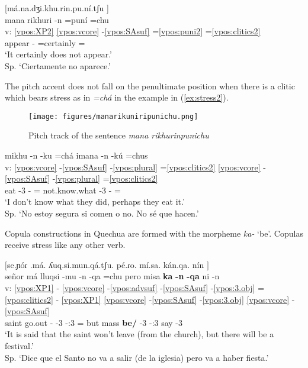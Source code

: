\documentclass[output=paper]{langscibook}
\begin{document}
\ea \label{ex:stress1}{
	[má.na.dʒi.khu.rin.pu.ní.tʃu \downarrow] \\
	\glll {} mana rikhuri -n =puní =chu \\
            v: \ref{vpos:XP2} \ref{vpos:vcore} -\ref{vpos:SAsuf} =\ref{vpos:puni2} =\ref{vpos:clitics2}  \\
            {} \Neg{} appear -\Third{} =certainly =\Neg{} \\
	\glt `It certainly does not appear.' \\  Sp. `Ciertamente no aparece.'
	}
\z

The pitch accent does not fall on the penultimate position when there is a clitic which bears stress as in \textit{=chá} in the example in (\ref{ex:stress2}).


\begin{figure}
    \centering
    \texttt{[image: figures/manarikuniripunichu.png]}
    \caption{Pitch track of the sentence \textit{mana rikhurinpunichu}}
    \label{fig:manarikhurinpunichu}
\end{figure}


\ea \label{ex:stress2}{
	\glll {} mikhu -n -ku =chá imana -n -kú =chus \\
            v: \ref{vpos:vcore} -\ref{vpos:SAsuf} -\ref{vpos:plural} =\ref{vpos:clitics2} \ref{vpos:vcore} -\ref{vpos:SAsuf} -\ref{vpos:plural} =\ref{vpos:clitics2} \\
            {} eat -3 -\Pl{} =\Dub{} not.know.what -3 -\Pl{} =\Dub{}  \\
	\glt `I don't know what they did, perhaps they eat it.' \\ Sp. `No estoy segura si comen o no. No sé que hacen.' 
	}
\z

Copula constructions in Quechua are formed with the morpheme \textit{ka-} `be'. Copulas receive stress like any other verb.

\ea{}
    $[$se.ɲóɾ .má. ʎuq.si.mun.qá.tʃu. pé.ɾo. mí.sa. kán.qa. nín \downarrow$]$ \\
    \glll {} señor má lluqsi -mu -n -qa =chu pero misa \textbf{ka} \textbf{-n} \textbf{-qa} ni -n \\
    v: \ref{vpos:XP1} - \ref{vpos:vcore} -\ref{vpos:advsuf} -\ref{vpos:SAsuf} -\ref{vpos:3.obj} =\ref{vpos:clitics2} - \ref{vpos:XP1} \ref{vpos:vcore} -\ref{vpos:SAsuf} -\ref{vpos:3.obj} \ref{vpos:vcore} -\ref{vpos:SAsuf}     \\
    {} saint \Neg{} go.out -\Dir{} -3 -\Fut{}:3 =\Neg{} but mass \textbf{be/\Aux{}} -3 -\Fut{}:3 say -3  \\
    \glt `It is said that the saint won't leave (from the church), but there will be a festival.' \\ Sp. `Dice que el Santo no va a salir (de la iglesia) pero va a haber fiesta.'
\z 
\end{document}
